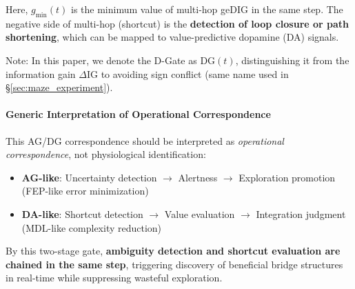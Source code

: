 \documentclass[12pt]{article}
\begin{document}
Here, $g_{\min}(t)$ is the minimum value of multi-hop geDIG in the same step. The negative side of multi-hop (shortcut) is the \textbf{detection of loop closure or path shortening}, which can be mapped to value-predictive dopamine (DA) signals.

\noindent Note: In this paper, we denote the D-Gate as $\mathrm{DG}(t)$, distinguishing it from the information gain $\Delta\mathrm{IG}$ to avoiding sign conflict (same name used in \S\ref{sec:maze_experiment}).

\paragraph{Generic Interpretation of Operational Correspondence}
This AG/DG correspondence should be interpreted as \emph{operational correspondence}, not physiological identification:
\begin{itemize}
  \item \textbf{AG-like}: Uncertainty detection $\to$ Alertness $\to$ Exploration promotion (FEP-like error minimization)
  \item \textbf{DA-like}: Shortcut detection $\to$ Value evaluation $\to$ Integration judgment (MDL-like complexity reduction)
\end{itemize}

By this two-stage gate, \textbf{ambiguity detection and shortcut evaluation are chained in the same step}, triggering discovery of beneficial bridge structures in real-time while suppressing wasteful exploration.
\end{document}
